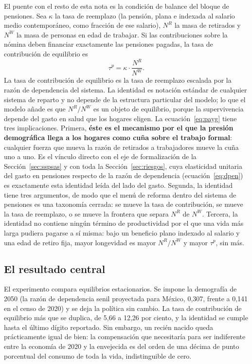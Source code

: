 \documentclass[12pt, letterpaper]{article}
\begin{document}
El puente con el resto de esta nota es la condición de balance del bloque de
pensiones. Sea $\kappa$ la tasa de reemplazo (la pensión, plana e indexada al
salario medio contemporáneo, como fracción de ese salario), $N^{R}$ la masa de retirados y $N^{W}$ la masa de personas en edad
de trabajar. Si las contribuciones sobre la nómina deben financiar exactamente las
pensiones pagadas, la tasa de contribución de equilibrio es
\begin{equation}
  \tau^{p} = \kappa \cdot \frac{N^{R}}{N^{W}}.
  \label{eq:payg}
\end{equation}
La tasa de contribución de equilibrio es la tasa de reemplazo escalada por la
razón de dependencia del sistema. La identidad es notación estándar de cualquier
sistema de reparto y no depende de la estructura particular del modelo; lo que el
modelo añade es que $N^{R}/N^{W}$ es un objeto de equilibrio, porque la
supervivencia depende del gasto en salud que los hogares eligen. La
ecuación~\eqref{eq:payg} tiene tres implicaciones. Primera, \textbf{éste es el mecanismo por el
que la presión demográfica llega a los hogares como cuña sobre el trabajo formal}:
cualquier fuerza que mueva la razón de retirados a trabajadores mueve la cuña uno
a uno. Es el vínculo directo con el eje de formalización de la
Sección~\ref{sec:sspsas} y con toda la Sección~\ref{sec:riesgos}, cuya elasticidad
unitaria del gasto en pensiones respecto de la razón de dependencia
(ecuación~\eqref{eq:dpen}) es exactamente esta identidad leída del lado del gasto.
Segunda, la identidad tiene tres argumentos, de modo que el menú de
reforma dentro del sistema de pensiones es una taxonomía cerrada: se mueve la tasa
de contribución, se mueve la tasa de reemplazo, o se mueve la frontera que separa
$N^{R}$ de $N^{W}$. Tercera, la identidad no contiene ningún término de
productividad por el que una vida más larga pudiera pagarse a sí misma: bajo un
beneficio plano indexado al salario y una edad de retiro fija, mayor longevidad es
mayor $N^{R}/N^{W}$ y mayor $\tau^{p}$, sin más.

\subsection{El resultado central}

El experimento compara equilibrios estacionarios. Se impone la demografía de 2050
(la razón de dependencia senil proyectada para México, 0,307, frente a 0,141 en
el censo de 2020) y se deja la política sin cambio. La tasa de contribución de
equilibrio más que se duplica, de 5,66 a 12,26 por ciento, y la identidad se
cumple hasta el último dígito reportado. Sin embargo, un recién nacido queda
prácticamente igual de bien: la compensación que necesitaría para ser indiferente
entre la economía de 2020 y la envejecida es del orden de una décima de punto
porcentual del consumo de toda la vida, indistinguible de cero.
\end{document}
